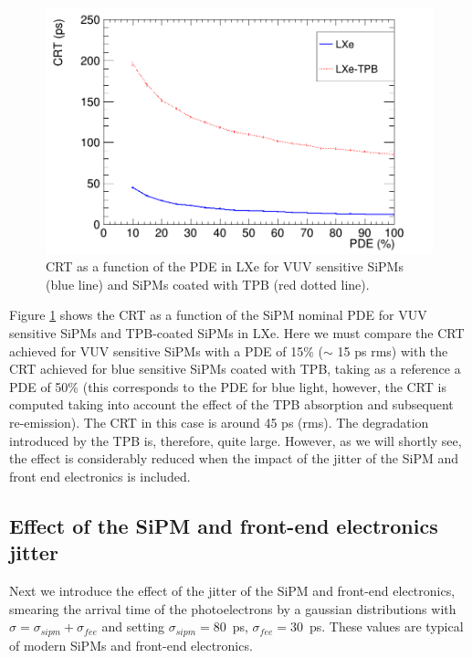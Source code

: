 \documentclass[review]{elsarticle}
\begin{document}
\begin{figure}[!bhtp]
	\centering
	\includegraphics[scale=0.4]{../img/CRTvsPDELXeTPBNoJitter.png}
	\caption{\label{fig.crt2} CRT as a function of the PDE in LXe for VUV sensitive SiPMs (blue line) and SiPMs coated with TPB (red dotted line). }
\end{figure}

Figure \ref{fig.crt2} shows the CRT as a function of the
 SiPM nominal PDE for VUV sensitive SiPMs and TPB-coated SiPMs in LXe. Here we must compare the CRT achieved for VUV sensitive SiPMs with a PDE of 15\% ($\sim$ 15 ps rms) with the CRT achieved for blue sensitive SiPMs coated with TPB, taking as a reference a PDE of 50\% (this corresponds to the
 PDE for blue light,  however, the CRT is computed taking into account the effect of the TPB absorption and subsequent re-emission).  The CRT in this case is around 45 ps (rms). The degradation introduced by the TPB is, therefore, quite large. However, as we will shortly see, the effect is
 considerably reduced when the impact of the jitter of the SiPM and front end electronics is included. 
  
\subsection*{Effect of the SiPM  and front-end electronics jitter}
  Next we introduce the effect of the jitter of the SiPM and front-end electronics, smearing the arrival time of the photoelectrons by a gaussian distributions with $\sigma = \sigma_{sipm} +  \sigma_{fee}$ and setting 
 $\sigma_{sipm} = 80$~ps, $\sigma_{fee} = 30$~ps. These values are typical of modern SiPMs and front-end electronics. 
 
\end{document}
